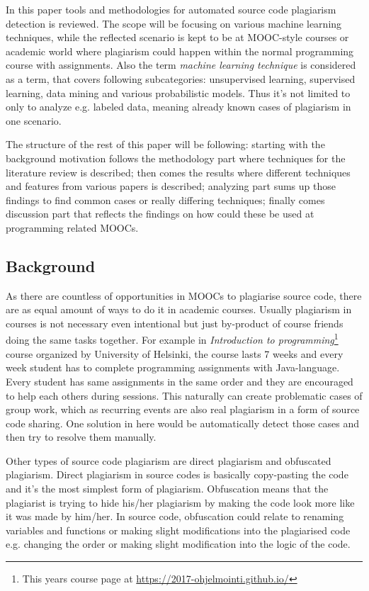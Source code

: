 \documentclass[english]{tktltiki2}
\theoremstyle{definition}
\theoremstyle{remark}
\begin{document}
In this paper tools and methodologies for automated source code plagiarism detection is reviewed. The scope will be focusing on various machine learning techniques, while the reflected scenario is kept to be at MOOC-style courses or academic world where plagiarism could happen within the normal programming course with assignments. Also the term \textit{machine learning technique} is considered as a term, that covers following subcategories: unsupervised learning, supervised learning, data mining and various probabilistic models. Thus it's not limited to only to analyze e.g. labeled data, meaning already known cases of plagiarism in one scenario. 

The structure of the rest of this paper will be following: starting with the background motivation follows the methodology part where techniques for the literature review is described; then comes the results where different techniques and features from various papers is described; analyzing part sums up those findings to find common cases or really differing techniques; finally comes discussion part that reflects the findings on how could these be used at programming related MOOCs.

\subsection{Background}


As there are countless of opportunities in MOOCs to plagiarise source code, there are as equal amount of ways to do it in academic courses. Usually plagiarism in courses is not necessary even intentional but just by-product of course friends doing the same tasks together. For example in \textit{Introduction to programming}\footnote{This years course page at \url{https://2017-ohjelmointi.github.io/}} course organized by University of Helsinki, the course lasts 7 weeks and every week student has to complete programming assignments with Java-language. Every student has same assignments in the same order and they are encouraged to help each others during sessions. This naturally can create problematic cases of group work, which as recurring events are also real plagiarism in a form of source code sharing. One solution in here would be automatically detect those cases and then try to resolve them manually.  

Other types of source code plagiarism are direct plagiarism and obfuscated plagiarism. Direct plagiarism in source codes is basically copy-pasting the code and it's the most simplest form of plagiarism. Obfuscation means that the plagiarist is trying to hide his/her plagiarism by making the code look more like it was made by him/her. In source code, obfuscation could relate to renaming variables and functions or making slight modifications into the plagiarised code e.g. changing the order or making slight modification into the logic of the code.
\end{document}
